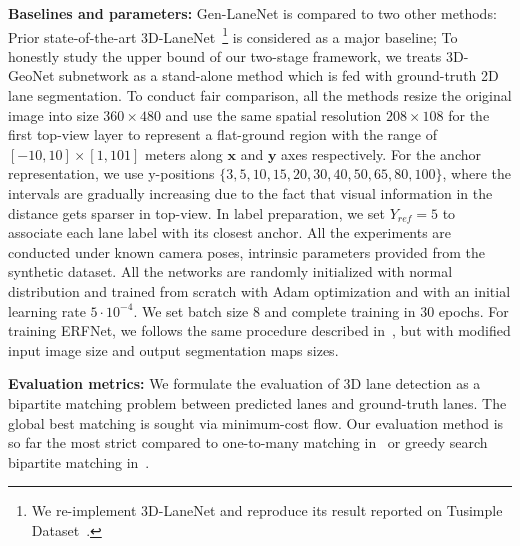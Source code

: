 \documentclass[10pt,twocolumn,letterpaper]{article}
\begin{document}
{\bf Baselines and parameters:} Gen-LaneNet is compared to two other methods: Prior state-of-the-art 3D-LaneNet~\cite{Garnett:etal:ICCV2019}\footnote{We re-implement 3D-LaneNet and reproduce its result reported on Tusimple Dataset~\cite{Tusimple2018}.} is considered as a major baseline; To honestly study the upper bound of our two-stage framework, we treats 3D-GeoNet subnetwork as a stand-alone method which is fed with ground-truth 2D lane segmentation. To conduct fair comparison, all the methods resize the original image into size $360\times480$ and use the same spatial resolution $208\times108$ for the first top-view layer to represent a flat-ground region with the range of $[{-10}, 10] \times [1, 101]$ meters along $\boldsymbol{x}$ and $\boldsymbol{y}$ axes respectively. For the anchor representation, we use y-positions $\{3, 5 , 10, 15, 20, 30, 40, 50, 65, 80, 100\}$, where the intervals are gradually increasing due to the fact that visual information in the distance gets sparser in top-view. In label preparation, we set $Y_{ref}=5$ to associate each lane label with its closest anchor. All the experiments are conducted under known camera poses, intrinsic parameters provided from the synthetic dataset. All the networks are randomly initialized with normal distribution and trained from scratch with Adam optimization and with an initial learning rate $5\cdot10^{-4}$. We set batch size $8$ and complete training in $30$ epochs. For training ERFNet, we follows the same procedure described in~\cite{Romera:etal:ERFNet:TITS2018}, but with modified input image size and output segmentation maps sizes.

{\bf Evaluation metrics:} We formulate the evaluation of 3D lane detection as a bipartite matching problem between predicted lanes and ground-truth lanes. The global best matching is sought via minimum-cost flow. Our evaluation method is so far the most strict compared to one-to-many matching in~\cite{Tusimple2018} or greedy search bipartite matching in~\cite{Garnett:etal:ICCV2019}. 
\end{document}
